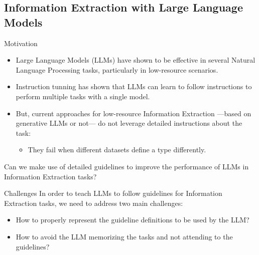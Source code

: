 \documentclass[
    11pt,
    notheorems,
    xcolor={dvipsnames},
    hyperref={
        pdfstartview=FitH, 
        pdftitle={Ikasketa-adibide urriko Informazio-Erauzketa}, 
        pdfauthor={Oscar Sainz Jimenez}, 
        citecolor=secondary, 
    }
]{beamer}
\begin{document}
\subsection{Information Extraction with Large Language Models}
\makesubsectiontitlepage

\begin{frame}
    \begin{block}{Motivation}
        \begin{itemize}[<+->]
            \item Large Language Models (LLMs) have shown to be effective in several Natural Language Processing tasks, particularly in low-resource scenarios.
            \item Instruction tunning has shown that LLMs can learn to follow instructions to perform multiple tasks with a single model.
            \item But, current approaches for low-resource Information Extraction ---based on generative LLMs or not--- do not leverage detailed instructions about the task:
                  \begin{itemize}
                      \item They fail when different datasets define a type differently.
                  \end{itemize}
        \end{itemize}
        \blockskip

         Can we make use of detailed guidelines to improve the performance of LLMs in Information Extraction tasks?
    \end{block}
\end{frame}

\begin{frame}
    \begin{block}{Challenges}
        In order to teach LLMs to follow guidelines for Information Extraction tasks, we need to address two main challenges:
        \begin{itemize}
            \item How to properly represent the guideline definitions to be used by the LLM?
            \item How to avoid the LLM memorizing the tasks and not attending to the guidelines?
        \end{itemize}
    \end{block}
\end{frame}
\end{document}
